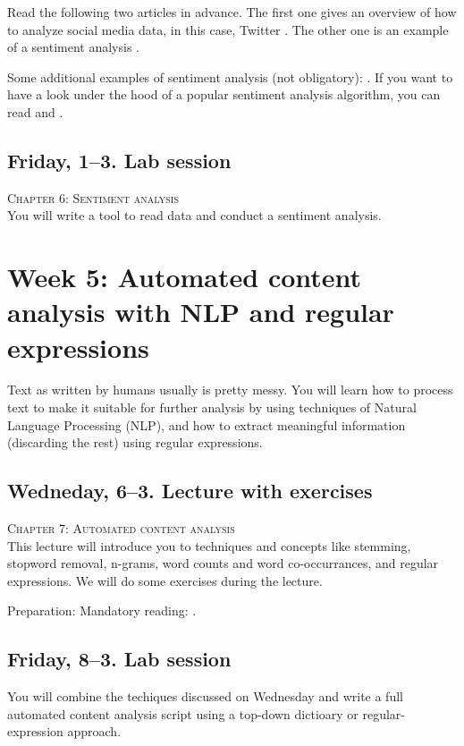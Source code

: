 \documentclass[a4paper,10pt]{report}
\begin{document}
Read the following two articles in advance. The first one gives an overview of how to analyze social media data, in this case, Twitter \citep{Bruns2013}. The other one is an example of a sentiment analysis \citep{Mostafa2013}.

Some additional examples of sentiment analysis (not obligatory): \cite{Huang2007,Pestian2012}. If you want to have a look under the hood of a popular sentiment analysis algorithm, you can read \cite{Thelwall2012} and \cite{Hutto2014}.


\subsection*{Friday, 1--3. Lab session}
\textsc{ Chapter 6: Sentiment analysis}\\
You will write a tool to read data and conduct a sentiment analysis.






\section*{Week 5: Automated content analysis with NLP and regular expressions}
Text as written by humans usually is pretty messy. You will learn how to process text to make it suitable for further analysis by using techniques of Natural Language Processing (NLP), and how to extract meaningful information (discarding the rest) using regular expressions.




\subsection*{Wedneday, 6--3. Lecture with exercises}
\textsc{ Chapter 7: Automated content analysis}\\
This lecture will introduce you to techniques and concepts like stemming, stopword removal, n-grams, word counts and word co-occurrances, and regular expressions. We will do some exercises during the lecture.

Preparation: Mandatory reading: \citealp{Boumans2016}. 




\subsection*{Friday, 8--3. Lab session}
You will combine the techiques discussed on Wednesday and write a full automated content analysis script using a top-down dictioary or regular-expression approach.
\end{document}
